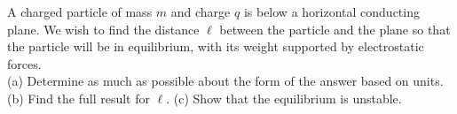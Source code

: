 A charged particle of mass $m$ and charge $q$ is
below a horizontal conducting plane. We wish to find the distance
$\ell$ between the particle and the plane so that the particle
will be in equilibrium, with its weight supported by electrostatic forces.\\
(a) Determine as much as possible about the form of the answer based
on units.\hwendpart
(b) Find the full result for $\ell$.\answercheck\hwendpart
(c) Show that the equilibrium is unstable.

